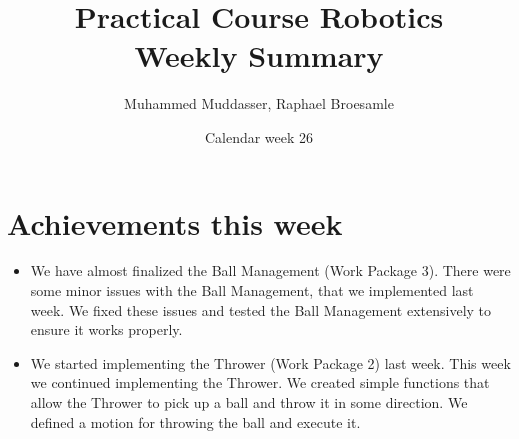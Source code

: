 \documentclass[12pt,pdftex,a4paper]{article}
\begin{document}
\title{Practical Course Robotics\\Weekly Summary}
\author{Muhammed Muddasser, Raphael Broesamle}
\date{Calendar week 26}
\maketitle

\section*{Achievements this week}
\begin{itemize}
\item
We have almost finalized the Ball Management (Work Package 3).
There were some minor issues with the Ball Management, that we implemented last week. 
We fixed these issues and tested the Ball Management extensively to ensure it works properly.
\item
We started implementing the Thrower (Work Package 2) last week.
This week we continued implementing the Thrower.
We created simple functions that allow the Thrower to pick up a ball and throw it in some direction.
We defined a motion for throwing the ball and execute it.
\end{itemize}
\end{document}
